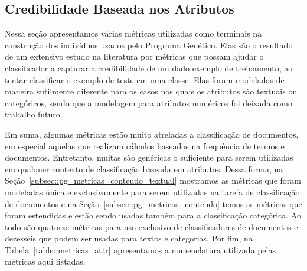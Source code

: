 
\subsection{Credibilidade Baseada nos Atributos}
\label{sec::pg_cred_baseada_conteudo}

Nessa seção apresentamos várias métricas utilizadas como terminais na construção dos indivíduos usados pelo Programa Genético. 
Elas são o resultado de um extensivo estudo na literatura por métricas que possam ajudar o classificador a capturar a credibilidade de um dado exemplo de treinamento, ao tentar classificar o exemplo de teste em uma classe.
Elas foram modeladas de maneira sutilmente diferente para os casos nos quais os atributos são textuais ou categóricos, sendo que a modelagem para atributos numéricos foi deixada como trabalho futuro. 

Em suma, algumas métricas estão muito atreladas a classificação de documentos, em especial aquelas que realizam cálculos baseados na frequência de termos e documentos. 
Entretanto, muitas são genéricas o suficiente para serem utilizadas em qualquer contexto de classificação baseada em atributos.
Dessa forma, na Seção~\ref{subsec::pg_metricas_conteudo_textual} mostramos as métricas que foram modeladas única e exclusivamente para serem utilizadas na tarefa de classificação de documentos  e na Seção~\ref{subsec::pg_metricas_conteudo} temos as métricas que foram estendidas e estão sendo usadas também para a classificação categórica.
Ao todo são quatorze métricas para uso exclusivo de classificadores de documentos e dezesseis que podem ser usadas para textos e categorias. Por fim, na Tabela~\ref{table::metricas_attr} apresentamos a nomenclatura utilizada pelas métricas aqui listadas.

